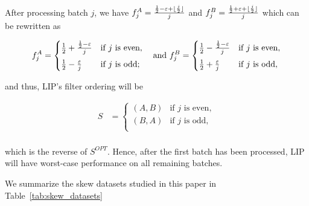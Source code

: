 \DeclarePairedDelimiter\floor{\lfloor}{\rfloor}
After processing batch $j$,  we have $f_j^A = \frac{\frac{1}{2} - \varepsilon + \floor{\frac{j}{2}}}{j}$ and $f_j^B = \frac{\frac{1}{2} + \varepsilon + \floor{\frac{j}{2}}}{j}$  which can be rewritten as

\begin{equation*}
f_j^A = 
    \begin{cases}
    \frac{1}{2} + \frac{\frac{1}{2}-\varepsilon}{j} & \text{if $j$ is even}, \\[0.5em]
    \frac{1}{2} - \frac{\varepsilon}{j} &  \text{if $j$ is odd}; \\
    \end{cases}  \quad \text{and }
f_j^B = 
    \begin{cases}
    \frac{1}{2} - \frac{\frac{1}{2}-\varepsilon}{j} & \text{if $j$ is even}, \\[0.5em]
    \frac{1}{2} + \frac{\varepsilon}{j} &  \text{if $j$ is odd}, \\
    \end{cases}\\[0.5em]
\end{equation*}

and thus, LIP's filter ordering will be

\begin{align*}
S &= 
    \begin{cases}
    (A, B) & \text{if $j$ is even}, \\[0.5em]
    (B, A) & \text{if $j$ is odd}, \\
    \end{cases}\\[0.5em]
\end{align*}

which is the reverse of $S^{OPT}$. 
Hence, after the first batch has been processed, LIP will have worst-case performance on all remaining batches.


We summarize the skew datasets studied in this paper in Table~\ref{tab:skew_datasets}

